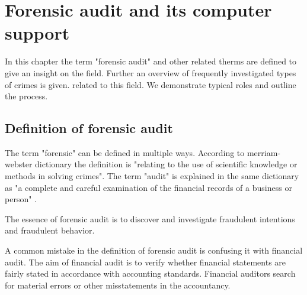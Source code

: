 \chapter{Forensic audit and its computer support}




In this chapter the term "forensic audit" and other related therms are defined to give an insight on the field. Further an overview of frequently investigated types of crimes is given.        related to this field. We demonstrate typical roles and outline the process.


\section{Definition of forensic audit}\label{FA_definition}
The term "forensic" can be defined in multiple ways. According to merriam-webster dictionary \cite{merriam-forensic} the definition is "relating to the use of scientific knowledge or methods in solving crimes". The term "audit" is explained in the same dictionary as "a complete and careful examination of the financial records of a business or person" \cite{merriam-audit}.

The essence of forensic audit is to discover and investigate fraudulent intentions and fraudulent behavior. 

A common mistake in the definition of forensic audit is confusing it with financial audit. The aim of financial audit is to verify whether financial statements are fairly stated in accordance with accounting standards. Financial auditors search for material errors or other misstatements in the accountancy.

